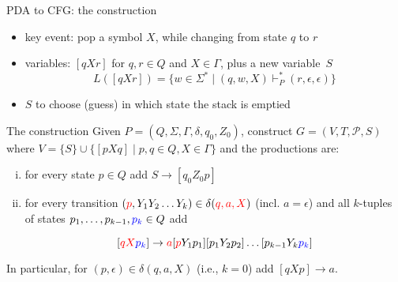 \documentclass[handout]{beamer}
\begin{document}
\begin{frame}{PDA to CFG: the construction}

    \vspace{-6pt}
    \begin{itemize}
        \item key event: pop a symbol $X$, while changing from state $q$ to $r$
        \item variables: $[qXr]$ for $q,r\in Q$ and $X\in \Gamma$, plus a new variable~$S$
        $$
        L([qXr])=\{w\in\Sigma^*\mid (q,w,X)\vdash_P^*(r,\epsilon,\epsilon)\}
        $$
        \item $S$ to choose (guess) in which state the stack is emptied
    \end{itemize}

    \begin{block}{The construction}
        Given $P=(Q,\Sigma,\Gamma,\delta,q_0,Z_0)$, construct $G=(V,T,\mathcal P,S)$ where $V=\{S\}\cup\{[pXq]\mid p,q\in Q,X\in\Gamma\}$ and the productions are:   
        \begin{enumerate}[(i)]
            \item for every state $p\in Q$ add $S\to [q_0 Z_0 p]$ 
            \item for every transition $({\color{red}p},Y_1Y_2\ldots Y_k)\in\delta({\color{red}q,a,X})$ (incl. $a=\epsilon$) and \alert{all $k$-tuples of states} $p_1,\dots,p_{k-1},{\color{blue}p_k}\in Q$ add
            
            \vspace{-6pt}
            $$
            [{\color{red}qX}{\color{blue}p_k}]\rightarrow {\color{red}a}[{\color{red}p}Y_1p_1][p_1Y_2p_2]\ldots [p_{k-1}Y_k{\color{blue}p_k}]
            $$                  
        \end{enumerate}        
        In particular, for $(p,\epsilon)\in\delta(q,a,X)$ (i.e., $k=0$) add $[qXp]\rightarrow a$.
    \end{block}

\end{frame}
\end{document}
